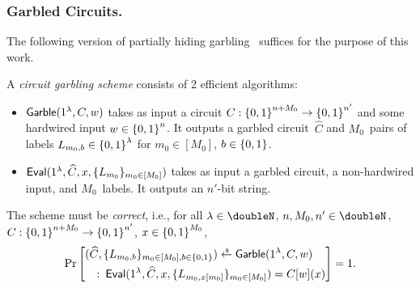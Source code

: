 \subsubsection{Garbled Circuits.}
The following version of partially hiding garbling~\cite{ICALP:IshWee14} suffices for the purpose of this work.

\begin{definition}\label{def:gc}
A \emph{circuit garbling scheme} consists of 2 efficient algorithms:
\begin{itemize}
\item $\Garble(1^\lambda,C,w)$
takes as input a circuit ${C:{\{0,1\}}^{n+M_0}\to{\{0,1\}}^{n'}}$ and some hardwired input ${w\in{\{0,1\}}^n}$.
It outputs a garbled circuit~$\widehat{C}$
and $M_0$~pairs of labels ${L_{m_0,b}\in{\{0,1\}}^\lambda}$
for ${m_0\in[M_0]}$, ${b\in{\{0,1\}}}$.
\item $\Eval(1^\lambda,\widehat{C},x,\{L_{m_0}\}_{m_0\in[M_0]})$
takes as input a garbled circuit, a non-hardwired input, and $M_0$~labels.
It outputs an $n'$-bit string.
\end{itemize}
The scheme must be \emph{correct}, i.e., for all
${\lambda\in\doubleN}$,
${n,M_0,n'\in\doubleN}$,%
${C:{\{0,1\}}^{n+M_0}\to{\{0,1\}}^{n'}}$,%
${x\in{\{0,1\}}^{M_0}}$,
\begin{align*}
\Pr\left[
\begin{aligned}
(\widehat{C},\{L_{m_0,b}\}_{m_0\in[M_0],b\in\bit})\draws\Garble(1^\lambda,{}&C,w)
\\\::\:
\Eval(1^\lambda,\widehat{C},x,\{L_{m_0,x[m_0]}\}_{m_0\in[M_0]})={}&C[w](x)
\end{aligned}
\right]=1.
\end{align*}
\end{definition}

